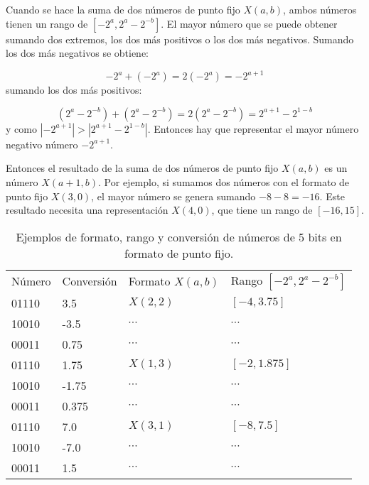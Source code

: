         Cuando se hace la suma de dos números de punto fijo $X(a,b)$, ambos números tienen un rango de $[-2^{a}, 2^{a} - 2^{-b}]$. El mayor número que se puede obtener sumando dos extremos, los dos más positivos o los dos más negativos. Sumando los dos más negativos se obtiene:

        \begin{equation}
            -2^{a} + (-2^{a}) = 2 (-2^{a}) = -2^{a+1}
            \label{eq:}
        \end{equation}
        sumando los dos más positivos:

        \begin{equation}
            (2^{a} - 2^{-b}) + (2^{a} - 2^{-b}) = 2 (2^{a} - 2^{-b}) = 2^{a+1} - 2^{1-b}            
            \label{eq:}
        \end{equation}
        y como $|-2^{a+1}| > |2^{a+1} - 2^{1-b}|$. Entonces hay que representar el mayor número negativo número $-2^{a+1}$.

        Entonces el resultado de la suma de dos números de punto fijo $X(a,b)$ es un número $X(a+1,b)$. Por ejemplo, si sumamos dos números con el formato de punto fijo $X(3,0)$, el mayor número se genera sumando $-8-8 = -16$. Este resultado necesita una representación $X(4,0)$, que tiene un rango de $[-16,15]$.

        \begin{table}[htbp]
            \centering
            \caption{Ejemplos de formato, rango y conversión de números de 5 bits en formato de punto fijo.}
            \begin{tabular}{|l|l|l|l|}
                \hline
                \rowcolor{lightgray}   Número & Conversión & Formato $X(a,b)$  & Rango $[-2^{a}, 2^{a} - 2^{-b}]$\\
                01110 & 3.5 & $X(2,2)$ & $[-4,3.75]$ \\ 
                \hline
                10010 & -3.5 & $\cdots$ & $\cdots$\\ 
                \hline
                00011 & 0.75 & $\cdots$ & $\cdots$\\ 
                \hline
                01110 & 1.75 & $X(1,3)$ & $[-2,1.875]$ \\ 
                \hline
                10010 & -1.75 & $\cdots$ & $\cdots$\\ 
                \hline
                00011 & 0.375 & $\cdots$ & $\cdots$\\ 
                \hline
                01110 & 7.0 & $X(3,1)$ & $[-8,7.5]$ \\ 
                \hline
                10010 & -7.0 & $\cdots$ & $\cdots$\\ 
                \hline
                00011 & 1.5 & $\cdots$ & $\cdots$\\ 
                \hline
            \end{tabular}
            \label{tab:ejemplos_puntofijo}
        \end{table}

